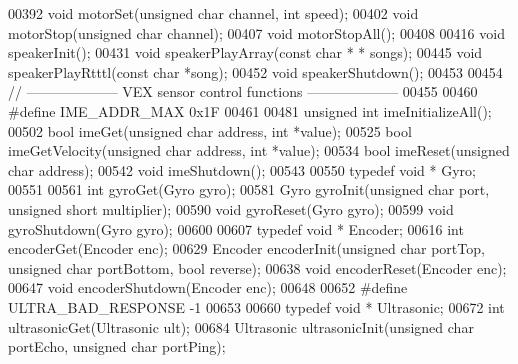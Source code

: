 \begin{DoxyCode}
00392 \textcolor{keywordtype}{void} motorSet(\textcolor{keywordtype}{unsigned} \textcolor{keywordtype}{char} channel, \textcolor{keywordtype}{int} speed);
00402 \textcolor{keywordtype}{void} motorStop(\textcolor{keywordtype}{unsigned} \textcolor{keywordtype}{char} channel);
00407 \textcolor{keywordtype}{void} motorStopAll();
00408 
00416 \textcolor{keywordtype}{void} speakerInit();
00431 \textcolor{keywordtype}{void} speakerPlayArray(\textcolor{keyword}{const} \textcolor{keywordtype}{char} * * songs);
00445 \textcolor{keywordtype}{void} speakerPlayRtttl(\textcolor{keyword}{const} \textcolor{keywordtype}{char} *song);
00452 \textcolor{keywordtype}{void} speakerShutdown();
00453 
00454 \textcolor{comment}{// -------------------- VEX sensor control functions --------------------}
00455 
00460 \textcolor{preprocessor}{#define IME\_ADDR\_MAX 0x1F}
00461 
00481 \textcolor{keywordtype}{unsigned} \textcolor{keywordtype}{int} imeInitializeAll();
00502 \textcolor{keywordtype}{bool} imeGet(\textcolor{keywordtype}{unsigned} \textcolor{keywordtype}{char} address, \textcolor{keywordtype}{int} *value);
00525 \textcolor{keywordtype}{bool} imeGetVelocity(\textcolor{keywordtype}{unsigned} \textcolor{keywordtype}{char} address, \textcolor{keywordtype}{int} *value);
00534 \textcolor{keywordtype}{bool} imeReset(\textcolor{keywordtype}{unsigned} \textcolor{keywordtype}{char} address);
00542 \textcolor{keywordtype}{void} imeShutdown();
00543 
00550 \textcolor{keyword}{typedef} \textcolor{keywordtype}{void} * Gyro;
00551 
00561 \textcolor{keywordtype}{int} gyroGet(Gyro gyro);
00581 Gyro gyroInit(\textcolor{keywordtype}{unsigned} \textcolor{keywordtype}{char} port, \textcolor{keywordtype}{unsigned} \textcolor{keywordtype}{short} multiplier);
00590 \textcolor{keywordtype}{void} gyroReset(Gyro gyro);
00599 \textcolor{keywordtype}{void} gyroShutdown(Gyro gyro);
00600 
00607 \textcolor{keyword}{typedef} \textcolor{keywordtype}{void} * Encoder;
00616 \textcolor{keywordtype}{int} encoderGet(Encoder enc);
00629 Encoder encoderInit(\textcolor{keywordtype}{unsigned} \textcolor{keywordtype}{char} portTop, \textcolor{keywordtype}{unsigned} \textcolor{keywordtype}{char} portBottom, \textcolor{keywordtype}{bool} reverse);
00638 \textcolor{keywordtype}{void} encoderReset(Encoder enc);
00647 \textcolor{keywordtype}{void} encoderShutdown(Encoder enc);
00648 
00652 \textcolor{preprocessor}{#define ULTRA\_BAD\_RESPONSE -1}
00653 
00660 \textcolor{keyword}{typedef} \textcolor{keywordtype}{void} * Ultrasonic;
00672 \textcolor{keywordtype}{int} ultrasonicGet(Ultrasonic ult);
00684 Ultrasonic ultrasonicInit(\textcolor{keywordtype}{unsigned} \textcolor{keywordtype}{char} portEcho, \textcolor{keywordtype}{unsigned} \textcolor{keywordtype}{char} portPing);

\end{DoxyCode}
